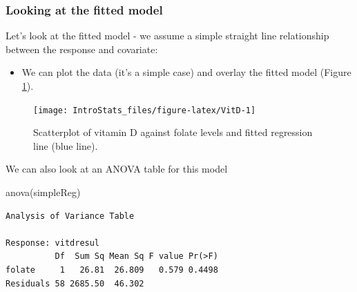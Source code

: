 \documentclass[
  oneside]{krantz}
\newenvironment{Shaded}{\begin{snugshade}}{\end{snugshade}}
\newcommand{\AttributeTok}[1]{\textcolor[rgb]{0.77,0.63,0.00}{#1}}
\newcommand{\CommentTok}[1]{\textcolor[rgb]{0.56,0.35,0.01}{\textit{#1}}}
\newcommand{\DecValTok}[1]{\textcolor[rgb]{0.00,0.00,0.81}{#1}}
\newcommand{\FunctionTok}[1]{\textcolor[rgb]{0.00,0.00,0.00}{#1}}
\newcommand{\NormalTok}[1]{#1}
\newcommand{\SpecialCharTok}[1]{\textcolor[rgb]{0.00,0.00,0.00}{#1}}
\newcommand{\StringTok}[1]{\textcolor[rgb]{0.31,0.60,0.02}{#1}}
\providecommand{\tightlist}{%
  \setlength{\itemsep}{0pt}\setlength{\parskip}{0pt}}
\begin{document}
\hypertarget{looking-at-the-fitted-model}{%
\subsubsection{Looking at the fitted model}\label{looking-at-the-fitted-model}}

Let's look at the fitted model - we assume a simple straight line relationship between the response and covariate:

\begin{itemize}
\tightlist
\item
  We can plot the data (it's a simple case) and overlay the fitted model (Figure \ref{fig:VitD}).
\end{itemize}

\begin{Shaded}
\end{Shaded}

\begin{figure}

{\centering \texttt{[image: IntroStats\_files/figure-latex/VitD-1]} 

}

\caption{Scatterplot of vitamin D against folate levels and fitted regression line (blue line). }\label{fig:VitD}
\end{figure}

We can also look at an ANOVA table for this model

\begin{Shaded}
\begin{Highlighting}[]
\FunctionTok{anova}\NormalTok{(simpleReg)}
\end{Highlighting}
\end{Shaded}

\begin{verbatim}
Analysis of Variance Table

Response: vitdresul
          Df  Sum Sq Mean Sq F value Pr(>F)
folate     1   26.81  26.809   0.579 0.4498
Residuals 58 2685.50  46.302               
\end{verbatim}
\end{document}
